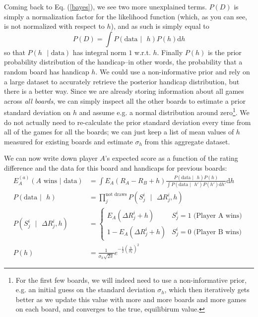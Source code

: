\documentclass[12pt]{article}
\begin{document}
	Coming back to Eq. (\ref{bayes}), we see two more unexplained terms. $P(D)$ is simply a normalization factor for the likelihood function (which, as you can see, is not normalized with respect to $h$), and as such is simply equal to
	\begin{equation}\label{likelihood_normalization}
	P(D) = \int P(\text{data } | \text{ }h)P(h) \text{d}h
	\end{equation}
	so that $P(h\text{ } | \text{ data})$ has integral norm $1$ w.r.t. $h$. Finally $P(h)$ is the prior probability distribution of the handicap--in other words, the probability that a random board has handicap $h$. We could use a non-informative prior and rely on a large dataset to accurately retrieve the posterior handicap distribution, but there is a better way. Since we are already storing information about all games across \textit{all boards}, we can simply inspect all the other boards to estimate a prior standard deviation on $h$ and assume e.g. a normal distribution around zero\footnote{For the first few boards, we will indeed need to use a non-informative prior, e.g. an initial guess on the standard deviation $\sigma_h$, which then iteratively gets better as we update this value with more and more boards and more games on each board, and converges to the true, equilibirum value.}. We do not actually need to re-calculate the prior standard deviation every time from all of the games for all the boards; we can just keep a list of mean values of $h$ measured for existing boards and estimate $\sigma_h$ from this aggregate dataset.
	
	We can now write down player $A$'s expected score as a function of the rating difference and the data for this board and handicaps for previous boards:
	\begin{align} \label{expectancy_based_on_data}
	E^{(a)}_A(A\text{ wins } | \text{ data}) &= \int E_A(R_A - R_B + h) \frac{P(\text{data } | \text{ }h)P(h)}{\int P(\text{data } | \text{ }h')P(h') \text{d}h'} \text{d}h \\
	P(\text{data } | \text{ }h) &= \prod_j^{\text{not draws}} P(S^i_j\text{ }|\text{ }\Delta R^i_j, h)\nonumber \\
	P(S^i_j\text{ }|\text{ }\Delta R^i_j, h)&=\begin{cases} 
      E_A(\Delta R^i_j + h) & S^i_j = 1\text{ (Player A wins)} \\
      1 - E_A(\Delta R^i_j + h) & S^i_j = 0\text{ (Player B wins)}
   \end{cases} \nonumber\\
   P(h) &= \frac{1}{\sigma_h\sqrt{2\pi}}e^{-\frac{1}{2}\left(\frac{h}{\sigma_h}\right)^2} \nonumber
	\end{align}
	
\end{document}
